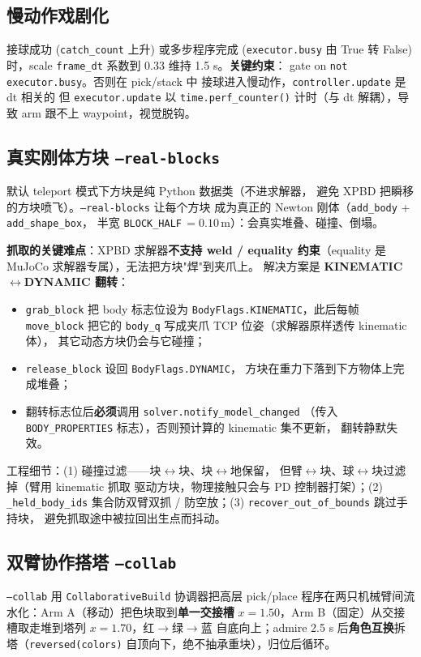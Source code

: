 \documentclass[12pt, a4paper, UTF8]{ctexart}
\begin{document}
\subsection{慢动作戏剧化}
接球成功 (\texttt{catch\_count} 上升) 或多步程序完成
(\texttt{executor.busy} 由 True 转 False) 时，scale
\texttt{frame\_dt} 系数到 0.33 维持 1.5 s。\textbf{关键约束}：
gate on \texttt{not executor.busy}。否则在 pick/stack 中
接球进入慢动作，\texttt{controller.update} 是 dt 相关的
但 \texttt{executor.update} 以 \texttt{time.perf\_counter()}
计时（与 dt 解耦），导致 arm 跟不上 waypoint，视觉脱钩。

\subsection{真实刚体方块 \texttt{--real-blocks}}
默认 teleport 模式下方块是纯 Python 数据类（不进求解器，
避免 XPBD 把瞬移的方块喷飞）。\texttt{--real-blocks} 让每个方块
成为真正的 Newton 刚体（\texttt{add\_body} + \texttt{add\_shape\_box}，
半宽 \texttt{BLOCK\_HALF}\,$=0.10$\,m）：会真实堆叠、碰撞、倒塌。

\textbf{抓取的关键难点}：XPBD 求解器\textbf{不支持 weld / equality
约束}（equality 是 MuJoCo 求解器专属），无法把方块"焊"到夹爪上。
解决方案是 \textbf{KINEMATIC$\leftrightarrow$DYNAMIC 翻转}：
\begin{itemize}[leftmargin=*, itemsep=0pt]
  \item \texttt{grab\_block} 把 body 标志位设为
    \texttt{BodyFlags.KINEMATIC}，此后每帧 \texttt{move\_block} 把它的
    \texttt{body\_q} 写成夹爪 TCP 位姿（求解器原样透传 kinematic 体），
    其它动态方块仍会与它碰撞；
  \item \texttt{release\_block} 设回 \texttt{BodyFlags.DYNAMIC}，
    方块在重力下落到下方物体上完成堆叠；
  \item 翻转标志位后\textbf{必须}调用 \texttt{solver.notify\_model\_changed}
    （传入 \texttt{BODY\_PROPERTIES} 标志），否则预计算的 kinematic 集不更新，
    翻转静默失效。
\end{itemize}
工程细节：(1) 碰撞过滤——块$\leftrightarrow$块、块$\leftrightarrow$地保留，
但臂$\leftrightarrow$块、球$\leftrightarrow$块过滤掉（臂用 kinematic 抓取
驱动方块，物理接触只会与 PD 控制器打架）；(2) \texttt{\_held\_body\_ids}
集合防双臂双抓 / 防空放；(3) \texttt{recover\_out\_of\_bounds} 跳过手持块，
避免抓取途中被拉回出生点而抖动。

\subsection{双臂协作搭塔 \texttt{--collab}}
\texttt{--collab} 用 \texttt{CollaborativeBuild} 协调器把高层 pick/place
程序在两只机械臂间流水化：Arm A（移动）把色块取到\textbf{单一交接槽}
$x=1.50$，Arm B（固定）从交接槽取走堆到塔列 $x=1.70$，红$\to$绿$\to$蓝
自底向上；admire 2.5 s 后\textbf{角色互换}拆塔（\texttt{reversed(colors)}
自顶向下，绝不抽承重块），归位后循环。
\end{document}
